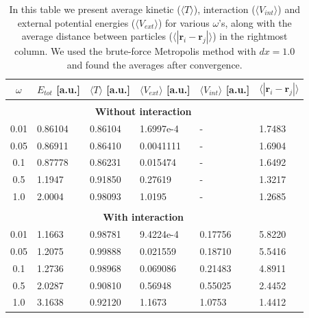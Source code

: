 \documentclass[norsk,a4paper,12pt]{article}
\begin{document}
\begin{table} [H]
	\caption{In this table we present average kinetic ($\langle T\rangle$), interaction ($\langle V_{int}\rangle$) and external potential energies ($\langle V_{ext}\rangle$) for various $\omega$'s, along with the average distance between particles ($\langle |\boldsymbol{r}_i-\boldsymbol{r}_j|\rangle$) in the rightmost column. We used the brute-force Metropolis method with $dx=1.0$ and found the averages after convergence.  \vspace{2mm}}
	\begin{tabularx}{\textwidth}{c|XXXXX} \hline\hline
		\label{tab:average_energies}
		$\omega$ & $ E_{tot}$ [a.u.] & $\langle T\rangle$ [a.u.] & $\langle V_{ext}\rangle$ [a.u.] & $\langle V_{int}\rangle$ [a.u.] & $\langle |\boldsymbol{r}_i-\boldsymbol{r}_j|\rangle$ \\ \hline \\
				& \multicolumn{4}{c}{\textbf{Without interaction}}\\ \hline
				0.01 & 0.86104 & 0.86104 & 1.6997e-4 & - & 1.7483 \\
				0.05 & 0.86911 & 0.86410 & 0.0041111 & - & 1.6904 \\
				0.1 & 0.87778 & 0.86231 & 0.015474 & - & 1.6492 \\
				0.5 & 1.1947 & 0.91850 & 0.27619 & - & 1.3217 \\
				1.0 & 2.0004 & 0.98093 & 1.0195 & - & 1.2685 \\ \hline \\
		& \multicolumn{4}{c}{\textbf{With interaction}}\\ \hline
				0.01 & 1.1663 & 0.98781 & 9.4224e-4 & 0.17756 & 5.8220 \\
				0.05 & 1.2075 & 0.99888 & 0.021559 & 0.18710 & 5.5416 \\
				0.1 & 1.2736 & 0.98968 & 0.069086 & 0.21483 & 4.8911 \\
				0.5 & 2.0287 & 0.90810 & 0.56948 & 0.55025 & 2.4452 \\
				1.0 & 3.1638 & 0.92120 & 1.1673 & 1.0753 & 1.4412 \\ \hline
	\end{tabularx}
\end{table}
\end{document}
